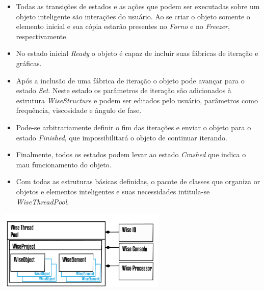 \documentclass[10pt]{beamer}
\theoremstyle{remark}
\theoremstyle{definition}
\begin{document}
\begin{frame}[allowframebreaks]
\begin{center}
		\end{center}
		
		\framebreak
		
		\begin{itemize}
			\item Todas as transições de estados e as ações que podem ser executadas sobre um objeto inteligente são interações do usuário. Ao se criar o objeto somente o elemento inicial e sua cópia estarão presentes no \textit{Forno} e no \textit{Freezer}, respectivamente.
			\item No estado inicial \textit{Ready} o objeto é capaz de incluir suas fábricas de iteração e gráficas.
			\item Após a inclusão de uma fábrica de iteração o objeto pode avançar para o estado \textit{Set}. Neste estado os parâmetros de iteração são adicionados à estrutura \textit{WiseStructure} e podem ser editados pelo usuário, parâmetros como frequência, viscosidade e ângulo de fase.
			\item Pode-se arbitrariamente definir o fim das iterações e enviar o objeto para o estado \textit{Finished}, que impossibilitará o objeto de continuar iterando.
			\item Finalmente, todos os estados podem levar ao estado \textit{Crashed} que indica o mau funcionamento do objeto.
		\end{itemize}
		
		\framebreak
		
			\begin{itemize}
					\item Com todas as estruturas básicas definidas, o pacote de classes que organiza or objetos e elementos inteligentes e suas necessidades intitula-se \textit{WiseThreadPool}.
			\end{itemize}		
		
		\begin{center}
			
			\item \includegraphics[width=0.6\textwidth]{images/WiseThreadPool.png}
			
		\end{center}
		

\end{frame}
\end{document}
